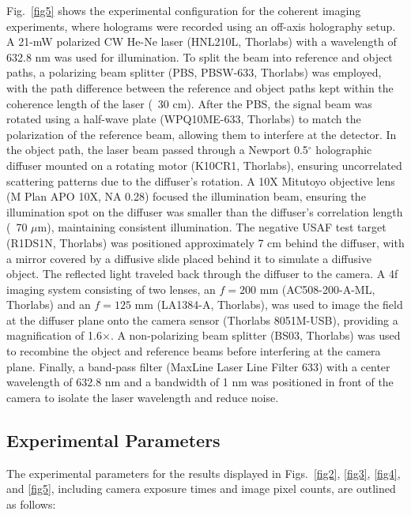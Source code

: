 \documentclass[pdflatex,sn-mathphys-num]{sn-jnl}%
\theoremstyle{thmstyleone}%
\theoremstyle{thmstyletwo}%
\theoremstyle{thmstylethree}%
\begin{document}
Fig.~\ref{fig5} shows the experimental configuration for the coherent imaging experiments, where holograms were recorded using an off-axis holography setup. A 21-mW polarized CW He-Ne laser (HNL210L, Thorlabs) with a wavelength of 632.8 nm was used for illumination. To split the beam into reference and object paths, a polarizing beam splitter (PBS, PBSW-633, Thorlabs) was employed, with the path difference between the reference and object paths kept within the coherence length of the laser (~30 cm). After the PBS, the signal beam was rotated using a half-wave plate (WPQ10ME-633, Thorlabs) to match the polarization of the reference beam, allowing them to interfere at the detector. In the object path, the laser beam passed through a Newport 0.5$^\circ$ holographic diffuser mounted on a rotating motor (K10CR1, Thorlabs), ensuring uncorrelated scattering patterns due to the diffuser's rotation. A 10X Mitutoyo objective lens (M Plan APO 10X, NA 0.28) focused the illumination beam, ensuring the illumination spot on the diffuser was smaller than the diffuser's correlation length (~70 $\mu$m), maintaining consistent illumination. The negative USAF test target (R1DS1N, Thorlabs) was positioned approximately 7 cm behind the diffuser, with a mirror covered by a diffusive slide placed behind it to simulate a diffusive object. The reflected light traveled back through the diffuser to the camera. A 4f imaging system consisting of two lenses, an $f=200$ mm (AC508-200-A-ML, Thorlabs) and an $f=125$ mm (LA1384-A, Thorlabs), was used to image the field at the diffuser plane onto the camera sensor (Thorlabs 8051M-USB), providing a magnification of 1.6$\times$. A non-polarizing beam splitter (BS03, Thorlabs) was used to recombine the object and reference beams before interfering at the camera plane. Finally, a band-pass filter (MaxLine Laser Line Filter 633) with a center wavelength of 632.8 nm and a bandwidth of 1 nm was positioned in front of the camera to isolate the laser wavelength and reduce noise.



\subsection*{Experimental Parameters}

The experimental parameters for the results displayed in Figs.~\ref{fig2}, \ref{fig3}, \ref{fig4}, and \ref{fig5}, including camera exposure times and image pixel counts, are outlined as follows:
\end{document}
